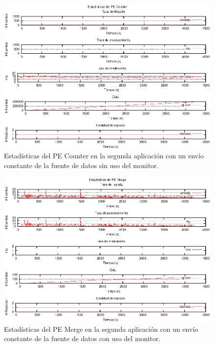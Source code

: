 \begin{figure}[p]
\centering
    \includegraphics[scale=1.1]{images/exp/app2/uniform/sm/statusCounterPE.eps}
    \caption{Estadísticas del PE Counter en la segunda aplicación con un envío constante de la fuente de datos sin uso del monitor.}
    \label{fig:app2-uniform-statusCounterPE-sm}
\end{figure}

\begin{figure}[p]
\centering
    \includegraphics[scale=1.1]{images/exp/app2/uniform/cm/statusMergePE.eps}
    \caption{Estadísticas del PE Merge en la segunda aplicación con un envío constante de la fuente de datos con uso del monitor.}
    \label{fig:app2-uniform-statusMergePE-cm}
\end{figure}

